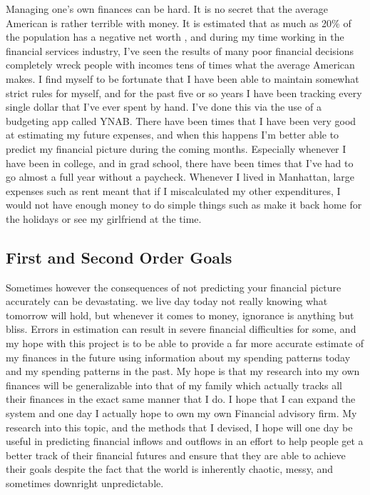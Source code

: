 \documentclass[11pt,a4paper]{article}
\begin{document}
Managing one's own finances can be hard. It is no secret that the average American is rather terrible with money. It is estimated that as much as 20\% of the population has a negative net worth \cite{BNP}, and during my time working in the financial services industry, I've seen the results of many poor financial decisions completely wreck people with incomes  tens of times what the average American makes. I find myself to be fortunate that I have been able to maintain somewhat strict rules for myself, and for the past five or so years I have been tracking every single dollar that I've ever spent by hand. I've done this via the use of a budgeting app called YNAB. There have been times that I have been very good at estimating my future expenses, and when this happens I'm better able to predict my financial picture during the coming months. Especially whenever I have been in college, and in grad school, there have been times that I've had to go almost a full year without a paycheck. Whenever I lived in Manhattan, large expenses such as rent meant that if I miscalculated my other expenditures, I would not have enough money to do simple things such as make it back home for the holidays or see my girlfriend at the time. 

\subsection{First and Second Order Goals}

Sometimes however the consequences of not predicting your financial picture accurately can be devastating. we live day today not really knowing what tomorrow will hold, but whenever it comes to money, ignorance is anything but bliss. Errors in estimation can result in severe financial difficulties for some, and my hope with this project is to be able to provide a far more accurate estimate of my finances in the future using information about my spending patterns today and my spending patterns in the past. My hope is that my research into my own finances will be generalizable into that of my family which actually tracks all their finances in the exact same manner that I do. I hope that I can expand the system and one day I actually hope to own my own Financial advisory firm. My research into this topic, and the methods that I devised, I hope will one day be useful in predicting financial inflows and outflows in an effort to help people get a better track of their financial futures and ensure that they are able to achieve their goals despite the fact that the world is inherently chaotic, messy, and sometimes downright unpredictable.
\end{document}
